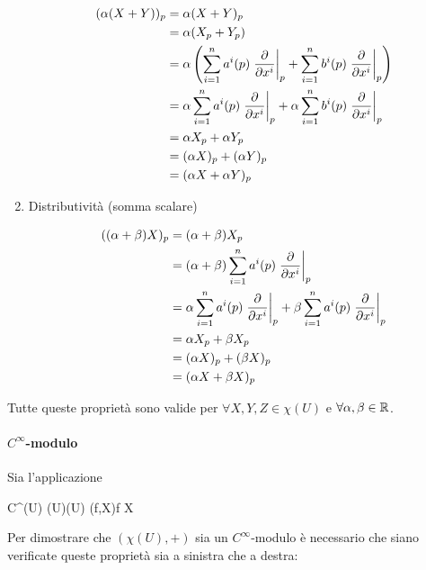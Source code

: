 \begin{enumerate}
	\begin{align}
		\begin{split}
			(\alpha (X + Y))_{p} &= \alpha (X + Y)_{p}\\
			&= \alpha (X_{p} + Y_{p})\\
			&= \alpha \left( \sum_{i=1}^{n} a^{i} (p) \eval{ \pdv{x^{i}} }_{p} + \sum_{i=1}^{n} b^{i} (p) \eval{ \pdv{x^{i}} }_{p} \right)\\
			&= \alpha \sum_{i=1}^{n} a^{i} (p) \eval{ \pdv{x^{i}} }_{p} + \alpha \sum_{i=1}^{n} b^{i} (p) \eval{ \pdv{x^{i}} }_{p}\\
			&= \alpha X_{p} + \alpha Y_{p}\\
			&= (\alpha X)_{p} + (\alpha Y)_{p}\\
			&= (\alpha X + \alpha Y)_{p}
		\end{split}
	\end{align}
	
	\item Distributività (somma scalare)
	
	\begin{align}
		\begin{split}
			((\alpha + \beta) X)_{p} &= (\alpha + \beta) X_{p}\\
			&= (\alpha + \beta) \sum_{i=1}^{n} a^{i} (p) \eval{ \pdv{x^{i}} }_{p}\\
			&= \alpha \sum_{i=1}^{n} a^{i} (p) \eval{ \pdv{x^{i}} }_{p} + \beta \sum_{i=1}^{n} a^{i} (p) \eval{ \pdv{x^{i}} }_{p}\\
			&= \alpha X_{p} + \beta X_{p}\\
			&= (\alpha X)_{p} + (\beta X)_{p}\\
			&= (\alpha X + \beta X)_{p} 
		\end{split}
	\end{align}
\end{enumerate}

Tutte queste proprietà sono valide per $ \forall X, Y, Z \in \chi(U) $ e $ \forall \alpha, \beta \in \mathbb{R} $.

\paragraph{$ C^{\infty} $-modulo}

Sia l'applicazione

\map{\cdot}
	{C^{\infty}(U) \times \chi(U)}{\chi(U)}
	{(f,X)}{f X}

Per dimostrare che $ (\chi(U),+) $ sia un $ C^{\infty} $-modulo è necessario che siano verificate queste proprietà sia a sinistra che a destra:


